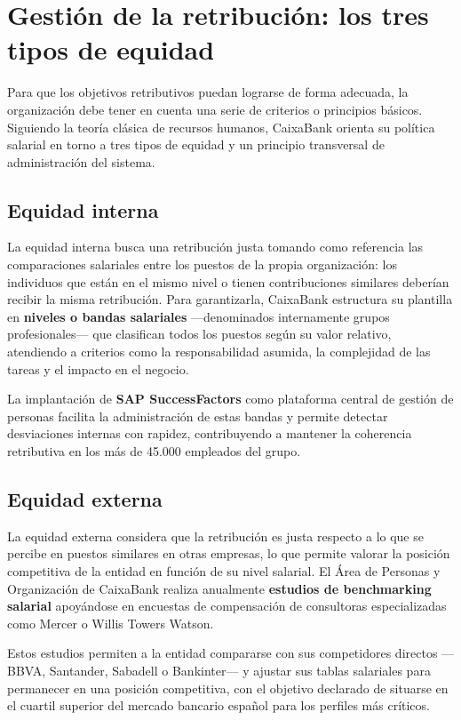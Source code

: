 \section{Gestión de la retribución: los tres tipos de equidad}

Para que los objetivos retributivos puedan lograrse de forma adecuada, la organización debe tener en cuenta una serie de criterios o principios básicos. Siguiendo la teoría clásica de recursos humanos, CaixaBank orienta su política salarial en torno a tres tipos de equidad y un principio transversal de administración del sistema.

\subsection{Equidad interna}

La equidad interna busca una retribución justa tomando como referencia las comparaciones salariales entre los puestos de la propia organización: los individuos que están en el mismo nivel o tienen contribuciones similares deberían recibir la misma retribución. Para garantizarla, CaixaBank estructura su plantilla en \textbf{niveles o bandas salariales} —denominados internamente grupos profesionales— que clasifican todos los puestos según su valor relativo, atendiendo a criterios como la responsabilidad asumida, la complejidad de las tareas y el impacto en el negocio.

La implantación de \textbf{SAP SuccessFactors} como plataforma central de gestión de personas facilita la administración de estas bandas y permite detectar desviaciones internas con rapidez, contribuyendo a mantener la coherencia retributiva en los más de 45.000 empleados del grupo.

\subsection{Equidad externa}

La equidad externa considera que la retribución es justa respecto a lo que se percibe en puestos similares en otras empresas, lo que permite valorar la posición competitiva de la entidad en función de su nivel salarial. El Área de Personas y Organización de CaixaBank realiza anualmente \textbf{estudios de benchmarking salarial} apoyándose en encuestas de compensación de consultoras especializadas como Mercer o Willis Towers Watson.

Estos estudios permiten a la entidad compararse con sus competidores directos —BBVA, Santander, Sabadell o Bankinter— y ajustar sus tablas salariales para permanecer en una posición competitiva, con el objetivo declarado de situarse en el cuartil superior del mercado bancario español para los perfiles más críticos.

